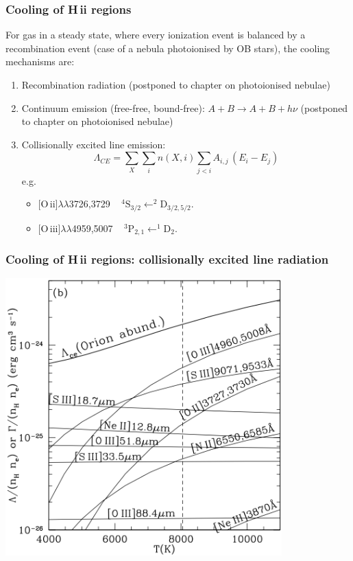 \begin{frame}
\end{frame} \begin{frame}\frametitle{Cooling of H\,{\sc ii} regions}


For gas in a steady state, where every ionization event is balanced by
a recombination event (case of a nebula photoionised by OB stars), the
cooling mechanisms are:


\begin{enumerate}

\item Recombination radiation (postponed to chapter on photoionised nebulae)
\item Continuum emission (free-free, bound-free):  $A + B   \rightarrow   A +
  B + h\nu $ (postponed to chapter on
  photoionised nebulae)

\item Collisionally excited line emission: 
$$\Lambda_{CE}= \sum_X \sum_i n(X,i) \sum_{j < i} A_{i,j}\, (E_i -
E_j)$$ e.g.
\begin{itemize}
\item   $[$O\,{\sc ii}$]\lambda\lambda$3726,3729 ~ $\mathrm{^4S_{3/2} \leftarrow ^2\!D_{3/2,5/2} } $.
\item   $[$O\,{\sc iii}$]\lambda\lambda$4959,5007 ~ $\mathrm{^3P_{2,1} \leftarrow ^1D_{2} } $.
\end{itemize}

\end{enumerate}


\end{frame} \begin{frame}\frametitle{Cooling of H\,{\sc ii} regions: collisionally excited line radiation}

\begin{center}
\includegraphics[width=0.8\textwidth,height=!]{./B/cooling_CE.png}
\end{center}


\end{frame}
